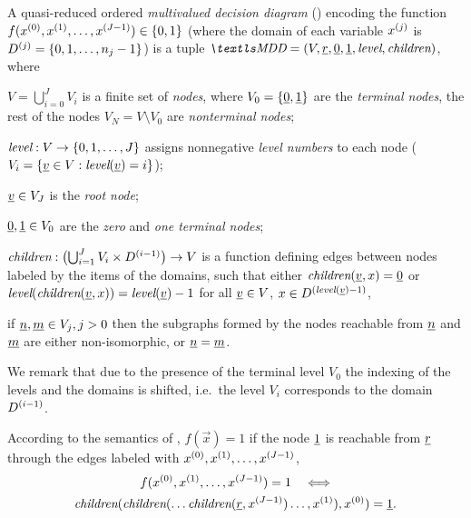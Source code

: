 \begin{dfn}
  A quasi-reduced ordered \emph{multivalued decision diagram}
  () encoding the function
  $f(x^{(0)}, x^{(1)}, \ldots, x^{(J - 1)}) \in \{0, 1\}$
  (where the domain of each variable $x^{(j)}$ is
  $D^{(j)} = \{0, 1, \ldots, n_j - 1\}$) is a tuple
  $\MDD = (V, \ddnode{r}, \ddnode{0}, \ddnode{1}, \mddLevel,
  \mddChildren)$, where
  \begin{asparaitem}
  \item $V = \bigcup_{i = 0}^{J} V_i$ is a finite set of \emph{nodes},
    where $V_0 = \{ \underline{0}, \underline{1} \}$ are the \emph{terminal
      nodes}, the rest of the nodes $V_N = V \setminus V_0$ are
    \emph{nonterminal nodes};
  \item $\textit{level} : V \to \{0, 1, \ldots, J\}$ assigns nonnegative
    \emph{level numbers} to each node
    ($V_i = \{\underline{v} \in V : \textit{level}(\underline{v}) = i \}$);
  \item $\underline{v} \in V_J$ is the \emph{root node};
  \item $\underline{0}, \underline{1} \in V_0$ are the \emph{zero} and
    \emph{one terminal nodes};
  \item $\textit{children}: \bigl( \bigcup_{i = 1}^J V_i \times D^{(i
      - 1)} \bigr) \to V$
    is a function defining edges between nodes labeled by the items of
    the domains, such that either
    $\textit{children}(\underline{v}, x) = \underline{0}$ or
    $\textit{level}(\textit{children}(\underline{v}, x)) = \textit{level}(\underline{v}) - 1$ for
    all $\underline{v} \in V$, $x \in D^{(\textit{level}(\underline{v}) - 1)}$,
  \item if $\underline{n}, \underline{m} \in V_j, j > 0$ then the subgraphs
    formed by the nodes reachable from $\underline{n}$ and $\underline{m}$
    are either non-isomorphic, or $\underline{n} = \underline{m}$.
  \end{asparaitem}
\end{dfn}

We remark that due to the presence of the terminal level $V_0$ the
indexing of the levels and the domains is shifted, i.e.~the level
$V_i$ corresponds to the domain $D^{(i - 1)}$.

According to the semantics of , $f(\vec{x}) = 1$ if the
node $\underline{1}$ is reachable from $\underline{r}$ through the edges
labeled with $x^{(0)}, x^{(1)}, \ldots, x^{(J - 1)}$,
\begin{multline}
  f(x^{(0)}, x^{(1)}, \ldots, x^{(J - 1)}) = 1
  \quad\Longleftrightarrow\\
  \textit{children}(\textit{children}(\ldots \textit{children}(\underline{r}, x^{(J
    - 1)}) \ldots, x^{(1)}), x^{(0)}) = \underline{1} \text.
\end{multline}

